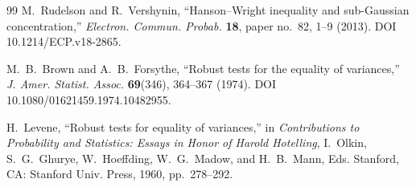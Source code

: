 \begin{thebibliography}{99}
M.~Rudelson and R.~Vershynin, ``Hanson--Wright inequality and sub-Gaussian concentration,'' \emph{Electron. Commun. Probab.} \textbf{18}, paper no.~82, 1--9 (2013). DOI 10.1214/ECP.v18-2865.

M.~B.~Brown and A.~B.~Forsythe, ``Robust tests for the equality of variances,'' \emph{J. Amer. Statist. Assoc.} \textbf{69}(346), 364--367 (1974). DOI 10.1080/01621459.1974.10482955.

H.~Levene, ``Robust tests for equality of variances,'' in \emph{Contributions to Probability and Statistics: Essays in Honor of Harold Hotelling}, I.~Olkin, S.~G.~Ghurye, W.~Hoeffding, W.~G.~Madow, and H.~B.~Mann, Eds. Stanford, CA: Stanford Univ. Press, 1960, pp.~278--292.

\end{thebibliography}

